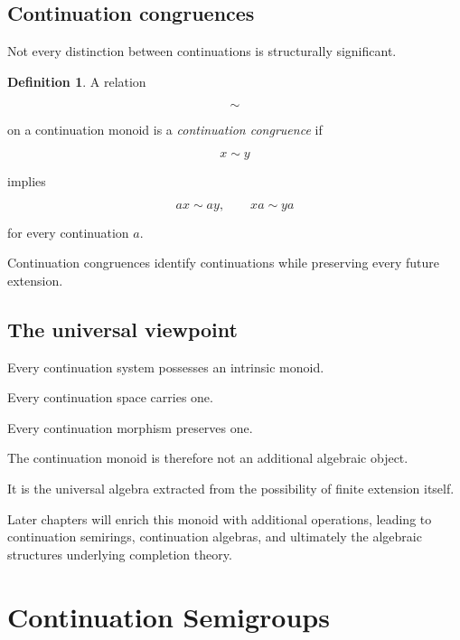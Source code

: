 \documentclass[13pt,openany]{book}
\theoremstyle{plain}
\theoremstyle{definition}
\newtheorem{definition}{Definition}[chapter]
\begin{document}
\section{Continuation congruences}

Not every distinction between continuations is structurally significant.

\begin{definition}

A relation

\[
\sim
\]

on a continuation monoid is a
\emph{continuation congruence} if

\[
x\sim y
\]

implies

\[
ax\sim ay,
\qquad
xa\sim ya
\]

for every continuation $a$.

\end{definition}

Continuation congruences identify continuations while preserving every future
extension.

\section{The universal viewpoint}

Every continuation system possesses an intrinsic monoid.

Every continuation space carries one.

Every continuation morphism preserves one.

The continuation monoid is therefore not an additional algebraic object.

It is the universal algebra extracted from the possibility of finite extension
itself.

Later chapters will enrich this monoid with additional operations, leading to
continuation semirings, continuation algebras, and ultimately the algebraic
structures underlying completion theory.

\chapter{Continuation Semigroups}
\end{document}
